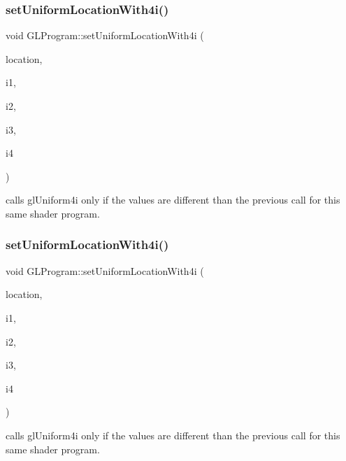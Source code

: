 \subsubsection{\texorpdfstring{set\+Uniform\+Location\+With4i()}{setUniformLocationWith4i()}\hspace{0.1cm}{\footnotesize\ttfamily [1/2]}}
{\footnotesize\ttfamily void G\+L\+Program\+::set\+Uniform\+Location\+With4i (\begin{DoxyParamCaption}\item[{G\+Lint}]{location,  }\item[{G\+Lint}]{i1,  }\item[{G\+Lint}]{i2,  }\item[{G\+Lint}]{i3,  }\item[{G\+Lint}]{i4 }\end{DoxyParamCaption})}

calls gl\+Uniform4i only if the values are different than the previous call for this same shader program. \mbox{\label{classGLProgram_ab0763aef27f2734758ea139dbfe9e139}} 
\subsubsection{\texorpdfstring{set\+Uniform\+Location\+With4i()}{setUniformLocationWith4i()}\hspace{0.1cm}{\footnotesize\ttfamily [2/2]}}
{\footnotesize\ttfamily void G\+L\+Program\+::set\+Uniform\+Location\+With4i (\begin{DoxyParamCaption}\item[{G\+Lint}]{location,  }\item[{G\+Lint}]{i1,  }\item[{G\+Lint}]{i2,  }\item[{G\+Lint}]{i3,  }\item[{G\+Lint}]{i4 }\end{DoxyParamCaption})}

calls gl\+Uniform4i only if the values are different than the previous call for this same shader program. \mbox{\label{classGLProgram_a8d7620f14405cd3fb99d83886ef15775}} 
